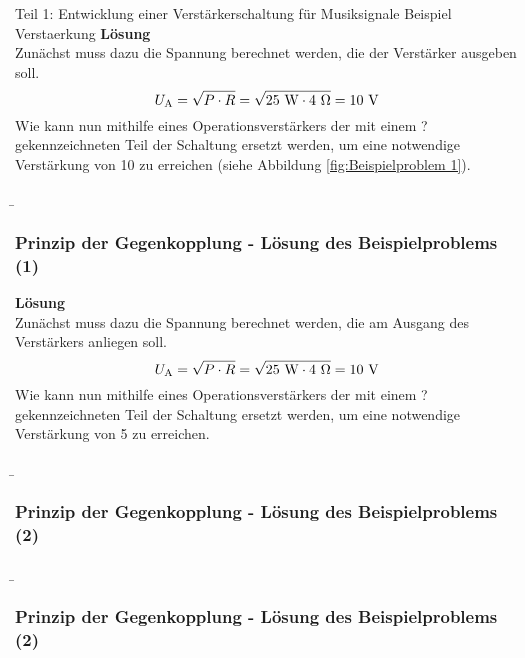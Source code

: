 \begin{frame}
{\begin{bsp}{ Teil 1: Entwicklung einer Verstärkerschaltung für Musiksignale}{ Beispiel Verstaerkung }
        \textbf{Lösung}\\
        Zunächst muss dazu die Spannung berechnet werden, die der Verstärker ausgeben soll. 
        \begin{equation}
            U_{\textnormal{A}} = \sqrt{P \cdot R} = \sqrt{25~\mathrm{W} \cdot 4~\mathrm{\Omega}} = 10~\textnormal{V}
        \end{equation}
        Wie kann nun mithilfe eines Operationsverstärkers der mit einem \glqq ?\grqq{} gekennzeichneten Teil der Schaltung ersetzt werden, um eine notwendige Verstärkung von 10 zu erreichen (siehe Abbildung \ref{fig:Beispielproblem 1}). 
    \end{bsp}}

    \b{
        \frametitle{Prinzip der Gegenkopplung - Lösung des Beispielproblems (1)}
        \textbf{Lösung}\\
        Zunächst muss dazu die Spannung berechnet werden, die am Ausgang des Verstärkers anliegen soll. 
        \begin{equation}
            U_{\textnormal{A}} = \sqrt{P \cdot R} = \sqrt{25~\mathrm{W} \cdot 4~\mathrm{\Omega}} = 10~\textnormal{V}
        \end{equation}
        Wie kann nun mithilfe eines Operationsverstärkers der mit einem \glqq ?\grqq{} gekennzeichneten Teil der Schaltung ersetzt werden, um eine notwendige Verstärkung von 5 zu erreichen. 
    }
\end{frame}

\begin{frame}
    \b{
            \frametitle{Prinzip der Gegenkopplung - Lösung des Beispielproblems (2)}
        }
    \end{frame}
    \begin{frame}
        \b{
            \frametitle{Prinzip der Gegenkopplung - Lösung des Beispielproblems (2)}
        }
    \end{frame}

